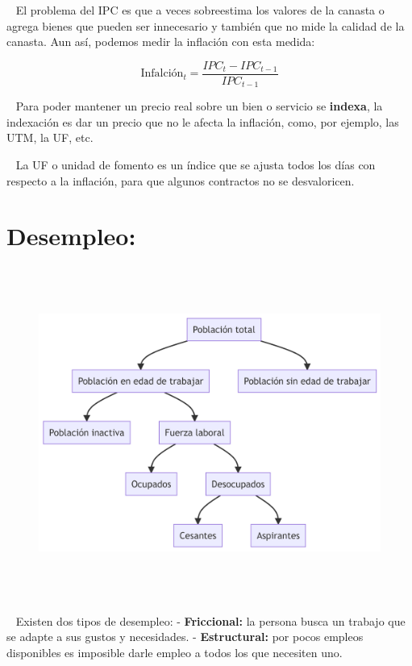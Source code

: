 \documentclass[
  letterpaper,
  DIV=11,
  numbers=noendperiod]{scrreport}
\begin{document}
~ El problema del IPC es que a veces sobreestima los valores de la
canasta o agrega bienes que pueden ser innecesario y también que no mide
la calidad de la canasta. Aun así, podemos medir la inflación con esta
medida:

\[
\text{Infalción}_t=\frac{IPC_t-IPC_{t-1}}{IPC_{t-1}}
\]

~ Para poder mantener un precio real sobre un bien o servicio se
\textbf{indexa}, la indexación es dar un precio que no le afecta la
inflación, como, por ejemplo, las UTM, la UF, etc.

~ La UF o unidad de fomento es un índice que se ajusta todos los días
con respecto a la inflación, para que algunos contractos no se
desvaloricen.

\hypertarget{desempleo}{%
\section{Desempleo:}\label{desempleo}}

\begin{figure}[H]

{\centering \includegraphics[width=6.16in,height=4.28in]{5varia_files/figure-latex/mermaid-figure-1.png}

}

\end{figure}

~ Existen dos tipos de desempleo: - \textbf{Friccional:} la persona
busca un trabajo que se adapte a sus gustos y necesidades. -
\textbf{Estructural:} por pocos empleos disponibles es imposible darle
empleo a todos los que necesiten uno.
\end{document}

